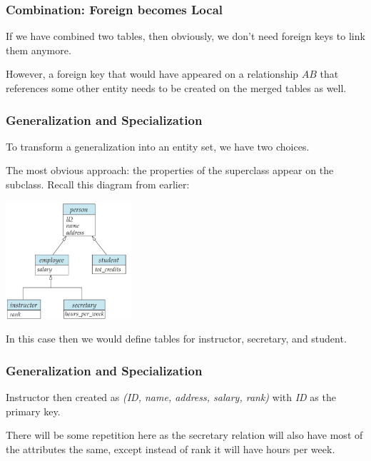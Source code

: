 \begin{frame}
\frametitle{Combination: Foreign becomes Local}

If we have combined two tables, then obviously, we don't need foreign keys to link them anymore. 

However, a foreign key that would have appeared on a relationship $AB$ that references some other entity needs to be created on the merged tables as well.


\end{frame}



\begin{frame}
\frametitle{Generalization and Specialization}

To transform a generalization into an entity set, we have two choices.

The most obvious approach: the properties of the superclass appear on the subclass. Recall this diagram from earlier:

\begin{center}
\includegraphics[width=0.35\textwidth]{images/specialization-generalization}
\end{center}

In this case then we would define tables for instructor, secretary, and student.

\end{frame}



\begin{frame}
\frametitle{Generalization and Specialization}

Instructor then created as \textit{(ID, name, address, salary, rank)} with \textit{ID} as the primary key. 

There will be some repetition here as the secretary relation will also have most of the attributes the same, except instead of rank it will have hours per week.

\end{frame}



